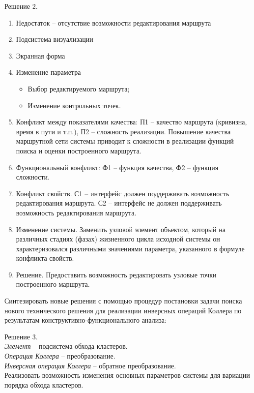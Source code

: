 Решение 2.
\begin{enumerate}
    \item Недостаток -- отсутствие возможности редактирования маршрута
    \item Подсистема визуализации
    \item Экранная форма
    \item Изменение параметра
    \begin{itemize}
        \item Выбор редактируемого маршрута;
        \item Изменение контрольных точек.
    \end{itemize}
    \item Конфликт между показателями качества: П1 -- качество маршрута (кривизна, время в пути и т.п.), 
        П2 -- сложность реализации. Повышение качества маршрутной сети системы приводит к сложности 
        в реализации функций поиска и оценки построенного маршрута.
    \item Функциональный конфликт: Ф1 -- функция качества, Ф2 -- 
        функция сложности.
    \item Конфликт свойств. С1 -- интерфейс должен поддерживать возможность редактирования маршрута. 
        С2 -- интерфейс не должен поддерживать возможность редактирования маршрута.
    \item Изменение системы. Заменить узловой элемент объектом, который на различных стадиях (фазах) 
        жизненного цикла исходной системы он характеризовался различными значениями параметра, 
        указанного в формуле конфликта свойств.
    \item Решение. Предоставить возможность редактировать узловые точки построенного маршрута.
\end{enumerate}

\pagebreak

Синтезировать новые решения с помощью процедур постановки задачи поиска нового технического решения 
для реализации инверсных операций Коллера по результатам конструктивно-функционального анализа:

Решение 3.\\
\emph{Элемент} -- подсистема обхода кластеров.\\
\emph{Операция Коллера} -- преобразование.\\
\emph{Инверсная операция Коллера} -- обратное преобразование.\\
Реализовать возможность изменения основных параметров системы для вариации порядка обхода кластеров.\\

